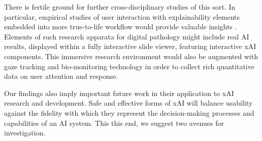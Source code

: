 



  


There is fertile ground for further cross-disciplinary studies of this sort. In particular, empirical studies of user interaction with explainability elements embedded into more true-to-life workflow would provide valuable insights . Elements of such research apparata for digital pathology might include real AI results, displayed within a fully interactive slide viewer, featuring interactive xAI components. This immersive research environment would also be augmented with gaze tracking and bio-monitoring technology in order to collect rich quantitative data on user attention and response. 

Our findings also imply important future work in their application to xAI research and development. Safe and effective forms of xAI will balance usability against the fidelity with which they represent the decision-making processes and capabilities of an AI system. This this end, we suggest two avenues for investigation. 

